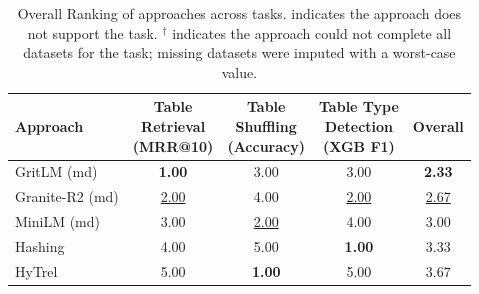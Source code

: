 \begin{table}[t]
\centering
\begin{tabular*}{\textwidth}{lcccc}
\hline
Approach & \makecell{Table \\ Retrieval \\ (MRR@10)} & \makecell{Table \\ Shuffling \\ (Accuracy)} & \makecell{Table Type \\ Detection \\ (XGB F1)} & Overall \\
\hline
GritLM (md) & \textbf{1.00} & 3.00 & 3.00 & \textbf{2.33} \\
Granite-R2 (md) & \underline{2.00} & 4.00 & \underline{2.00} & \underline{2.67} \\
MiniLM (md) & 3.00 & \underline{2.00} & 4.00 & 3.00 \\
Hashing & 4.00 & 5.00 & \textbf{1.00} & 3.33 \\
HyTrel & 5.00 & \textbf{1.00} & 5.00 & 3.67 \\
\hline
\end{tabular*}
\caption{Overall Ranking of approaches across tasks. \text{---} indicates the approach does not support the task. $^\dagger$ indicates the approach could not complete all datasets for the task; missing datasets were imputed with a worst-case value.}
\label{tab:overall_ranking}
\end{table}
